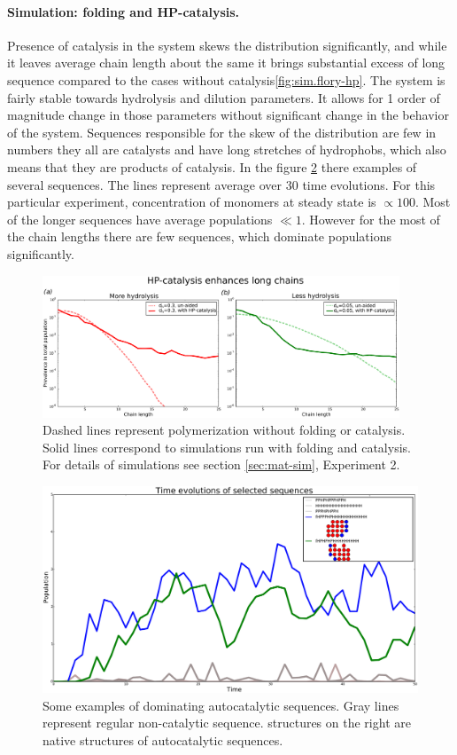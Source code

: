 \documentclass[journal=jacsat,manuscript=article,layout=twocolumn]{achemso}
\begin{document}
\paragraph{Simulation: folding and HP-catalysis.}Presence of catalysis in the system skews the 
distribution significantly, and while it leaves average chain length about the same it brings 
substantial excess of long sequence compared to the cases without catalysis\ref{fig:sim.flory-hp}. 
The system is fairly stable towards hydrolysis and dilution parameters. It allows for 1 order of 
magnitude change in those parameters without significant change in the behavior of the system. 
Sequences responsible for the skew of the distribution are few in numbers they all are catalysts 
and have long stretches of hydrophobs, which also means that they are products of catalysis. In 
the figure \ref{fig:example1} there examples of several sequences. The lines represent average 
over 30 time evolutions. For this particular experiment, concentration of monomers at steady 
state is $\propto 100$. Most of the longer sequences have average populations $\ll 1$. However for 
the most of the chain lengths there are few sequences, which dominate populations significantly.
\begin{figure}[h!]
  \centering
  \includegraphics[width=0.95\textwidth]{pictures/flory-and-hp.pdf} 
  \caption{Dashed lines represent polymerization without folding or catalysis. Solid lines 
correspond to simulations run with folding and catalysis. For details of simulations see 
section \ref{sec:mat-sim}, Experiment 2. }
  \label{fig:sim.flory-fold}
\end{figure}
\begin{figure}[h!]
  \centering
  \includegraphics[width=\columnwidth]{pictures/example1.pdf} 
  \caption{Some examples of dominating autocatalytic sequences. Gray lines represent regular 
non-catalytic sequence. structures on the right are native structures of autocatalytic sequences. }
  \label{fig:example1}
\end{figure}
\end{document}
